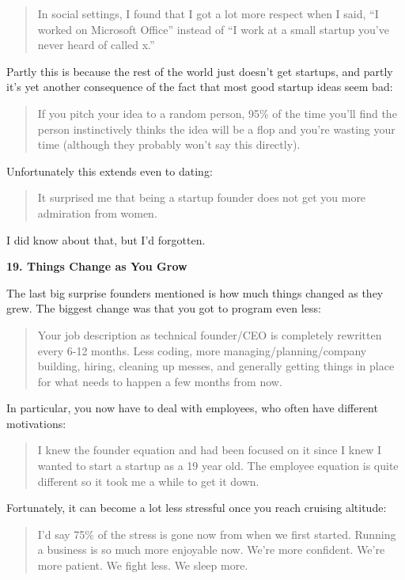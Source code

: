 \begin{quote}
In social settings, I found that I got a lot more respect when I said,
``I worked on Microsoft Office'' instead of ``I work at a small startup
you've never heard of called x.''
\end{quote}

Partly this is because the rest of the world just doesn't get startups,
and partly it's yet another consequence of the fact that most good
startup ideas seem bad:

\begin{quote}
If you pitch your idea to a random person, 95\% of the time you'll find
the person instinctively thinks the idea will be a flop and you're
wasting your time (although they probably won't say this directly).
\end{quote}

Unfortunately this extends even to dating:

\begin{quote}
It surprised me that being a startup founder does not get you more
admiration from women.
\end{quote}

I did know about that, but I'd forgotten.

\textbf{19. Things Change as You Grow}

The last big surprise founders mentioned is how much things changed as
they grew. The biggest change was that you got to program even less:

\begin{quote}
Your job description as technical founder/CEO is completely rewritten
every 6-12 months. Less coding, more managing/planning/company building,
hiring, cleaning up messes, and generally getting things in place for
what needs to happen a few months from now.
\end{quote}

In particular, you now have to deal with employees, who often have
different motivations:

\begin{quote}
I knew the founder equation and had been focused on it since I knew I
wanted to start a startup as a 19 year old. The employee equation is
quite different so it took me a while to get it down.
\end{quote}

Fortunately, it can become a lot less stressful once you reach cruising
altitude:

\begin{quote}
I'd say 75\% of the stress is gone now from when we first started.
Running a business is so much more enjoyable now. We're more confident.
We're more patient. We fight less. We sleep more.
\end{quote}

